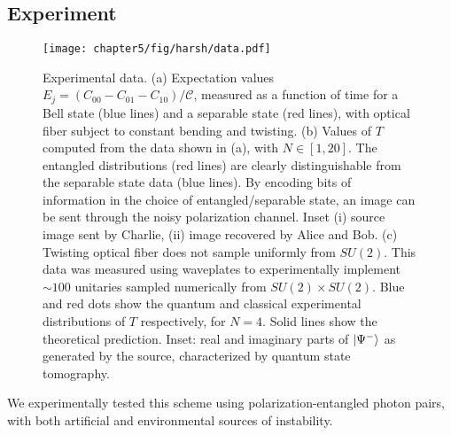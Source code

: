 \subsection{Experiment}
\begin{figure}[t!]
\texttt{[image: chapter5/fig/harsh/data.pdf]}
\caption[Detecting entanglement by bending single-mode fiber]{Experimental data. (a) Expectation values $E_j = (C_{00}-C_{01}-C_{10})/\mathcal{C}$, measured as a function of time for a Bell state (blue lines) and a separable state (red lines), with optical fiber subject to constant bending and twisting. (b) Values of $T$ computed from the data shown in (a), with $N \in \left[1, 20\right]$. The entangled distributions (red lines) are clearly distinguishable from the separable state data (blue lines). By encoding bits of information in the choice of entangled/separable state, an image can be sent through the noisy polarization channel. Inset (i) source image sent by Charlie, (ii) image recovered by Alice and Bob. (c) Twisting optical fiber does not sample uniformly from $SU(2)$. This data was measured using waveplates to experimentally implement $\sim100$ unitaries sampled numerically from $SU(2)\times SU(2)$. Blue and red dots show the quantum and classical experimental distributions of $T$ respectively, for $N=4$. Solid lines show the theoretical prediction. Inset: real and imaginary parts of $\mbox{$ | \Psi^- \rangle $}$ as generated by the source, characterized by quantum state tomography.
}
\label{fig:harsh-noise-data}
\end{figure}

We experimentally tested this scheme using polarization-entangled photon pairs, with both artificial and environmental sources of instability.

